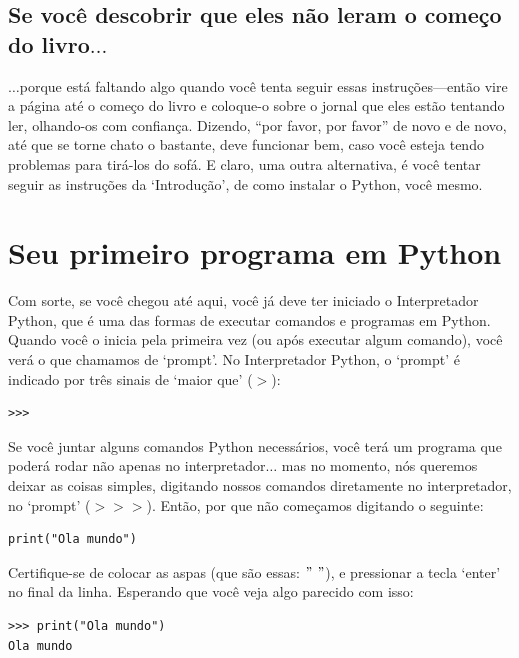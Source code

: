 \subsection*{\color{BrickRed}Se você descobrir que eles não leram o começo do livro$\ldots$}

$\ldots$porque está faltando algo quando você tenta seguir essas instruções---então vire a página até o começo do livro e coloque-o sobre o jornal que eles estão tentando ler, olhando-os com confiança. Dizendo, ``por favor, por favor'' de novo e de novo, até que se torne chato o bastante, deve funcionar bem, caso você esteja tendo problemas para tirá-los do sofá. E claro, uma outra alternativa, é você tentar seguir as instruções da `Introdução', de como instalar o Python, você mesmo.

\section{Seu primeiro programa em Python}

Com sorte, se você chegou até aqui, você já deve ter iniciado o Interpretador Python, que é uma das formas de executar comandos e programas em Python. Quando você o inicia pela primeira vez (ou após executar algum comando), você verá o que chamamos de `prompt'. No Interpretador Python, o `prompt' é indicado por três sinais de `maior que' ($>$):

\begin{listing}
\begin{verbatim}
>>>
\end{verbatim}
\end{listing}

Se você juntar alguns comandos Python necessários, você terá um programa que poderá rodar não apenas no interpretador$\ldots$ mas no momento, nós queremos deixar as coisas simples, digitando nossos comandos diretamente no interpretador, no `prompt' ($>>>$). Então, por que não começamos digitando o seguinte:

\begin{listing}
\begin{verbatim}
print("Ola mundo")
\end{verbatim}
\end{listing}

Certifique-se de colocar as aspas (que são essas: $"$ $"$), e pressionar a tecla `enter' no final da linha. Esperando que você veja algo parecido com isso:

\begin{listing}
\begin{verbatim}
>>> print("Ola mundo")
Ola mundo
\end{verbatim}
\end{listing}

